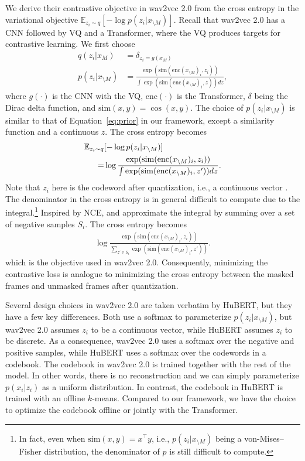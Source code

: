 \documentclass[11pt,a4paper]{article}
\def\Eqref#1{Equation~\ref{#1}}
\begin{document}
We derive their contrastive objective in wav2vec 2.0 from the cross entropy in the variational objective
 $\mathbb{E}_{z_i \sim q}[-\log p(z_i | x_{\setminus M})]$.
Recall that wav2vec 2.0 has a CNN followed by VQ and a Transformer,
where the VQ produces targets for contrastive learning.
%
We first choose
\begin{align}
q(z_i | x_M) &= \delta_{z_i=g(x_M)} \label{eq:w2v2-q}\\
p(z_i | x_{\setminus M}) &= \frac{\exp(\mathrm{sim}(\mathrm{enc}(x_{\setminus M})_i, z_i))}{
  \int \exp(\mathrm{sim}(\mathrm{enc}(x_{\setminus M})_i, z)) dz},
\end{align}
where $g(\cdot)$ is the CNN with the VQ, $\mathrm{enc}(\cdot)$ is the Transformer,
$\delta$ being the Dirac delta function, and $\mathrm{sim}(x, y) = \cos(x, y)$.
The choice of $p(z_i | x_{\setminus M})$ is similar to that of \Eqref{eq:prior} in our framework,
except a similarity function and a continuous $z$.
The cross entropy becomes
\begin{align}
    \mathbb{E}_{z_i \sim q}&[-\log p(z_i | x_{\setminus M})] \notag\\
    =&\log\frac{\exp(\mathrm{sim}(\mathrm{enc}(x_{\setminus M})_i, z_i))}{
   \int\exp(\mathrm{sim}(\mathrm{enc}(x_{\setminus M})_i, z')) dz}.
\end{align}
Note that $z_i$ here is the codeword after quantization, i.e., a continuous vector \citep{baevski2020wav2vec}.
The denominator in the cross entropy is in general difficult
to compute due to the integral.\footnote{In fact,
even when $\mathrm{sim}(x, y) = x^\top y$, i.e.,
$p(z_i | x_{\setminus M})$ being a von-Mises--Fisher distribution,
the denominator of $p$ is still difficult to compute.}
Inspired by NCE, \citet{oord2018representation} and \citet{baevski2020wav2vec}
approximate the integral by summing over a set of negative samples $S_i$. 
The cross entropy becomes
\begin{align}
    \log \frac{\exp(\mathrm{sim}(\mathrm{enc}(x_{\setminus M})_i, z_i))}{
  \sum_{z' \in S_i} \exp(\mathrm{sim}(\mathrm{enc}(x_{\setminus M})_i, z'))}.
  \label{eq:w2v2}
\end{align}
which is the objective used in wav2vec 2.0.
Consequently, minimizing the contrastive loss is analogue to minimizing the cross entropy between 
the masked frames and unmasked frames after quantization.

%
%
%
%
%
%
%
%
%
%
%
%
%
%
%
%
%
%
%
%
%
%
%

%
%
%
%
%
%
%
Several design choices in wav2vec 2.0 are taken verbatim by HuBERT, but they have a few key differences.
Both use a softmax to parameterize $p(z_i | x_{\setminus M})$, but wav2vec 2.0 assumes $z_i$ to be a continuous vector, while HuBERT assumes $z_i$ to be discrete.
As a consequence, wav2vec 2.0 uses a softmax over the negative and positive samples, while HuBERT uses a softmax over the codewords in a codebook.
The codebook in wav2vec 2.0 is trained together with the rest of the model.
In other words, there is no reconstruction and we can simply parameterize
$p(x_i | z_i)$ as a uniform distribution. 
In contrast, the codebook in HuBERT is trained with an offline $k$-means.
Compared to our framework, we have the choice to optimize the codebook
offline or jointly with the Transformer.
\end{document}
